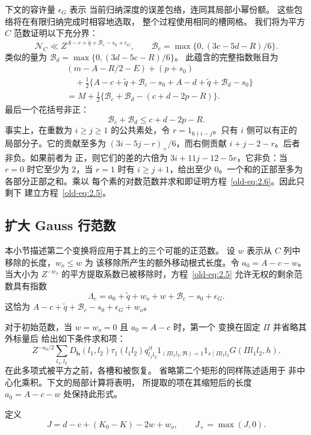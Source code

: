 下文的容许量 \(\epsilon_G\) 表示
当前归纳深度的误差包络，连同其局部小幂份额。
这些包络将在有限归纳完成时相容地选取，
整个过程使用相同的槽网格。
我们将为平方 \(C\)
范数证明以下充分界：
\begin{equation}
 \mathcal N_C\ll
 Z^{A-c+\widetilde q+\mathcal B_c-s_0+\epsilon_G},
 \qquad
 \mathcal B_c=\max\{0,(3c-5d-R)/6\}.
 \label{old-eq:2.5}
\end{equation}
类似的量为
\(\mathcal B_d=\max\{0,(3d-5c-R)/6\}\)。
此蕴含的完整指数账目为
\[
 \begin{aligned}
 &(m-A-R/2-E)+(p+s_0)\\
 &\quad+\tfrac12\{A-c+\widetilde q+\mathcal B_c-s_0
                  +A-d+\widetilde q+\mathcal B_d-s_0\}\\
 &=M+\tfrac12\{\mathcal B_c+\mathcal B_d-(c+d-2p-R)\}.
 \end{aligned}
\]
最后一个花括号非正：
\begin{equation}
 \mathcal B_c+\mathcal B_d\le c+d-2p-R.
 \label{old-eq:2.6}
\end{equation}
事实上，在重数为 \(i\ge j\ge1\) 的公共素处，令
\(r=1_{6\nmid i-j}\)。只有 \(i\) 侧可以有正的
局部分子。它的贡献至多为
\((3i-5j-r)_+/6\)，而右侧贡献
\(i+j-2-r\)。后者非负。如果前者为
正，则它们的差的六倍为
\(3i+11j-12-5r\)，它非负：当 \(r=0\) 时它至少为
\(2\)，当 \(r=1\) 时有 \(i\ge j+1\)，给出至少
\(0\)。一个和的正部至多为各部分正部之和。乘以
每个素的对数范数并求和即证明方程~\eqref{old-eq:2.6}。因此只剩下
建立方程~\eqref{old-eq:2.5}。

\subsection{扩大 Gauss 行范数}\label{sec:plain-gauss-enlargement}

本小节描述第二个变换将应用于其上的三个可能的正范数。
设 \(w\) 表示从 \(C\) 列中移除的长度，\(w_o\le w\) 为
该移除所产生的额外移动根式长度。令
\(a_0=A-c-w\)。当大小为
\(Z^{-w_o}\) 的平方提取系数已被移除时，方程~\eqref{old-eq:2.5}
允许无权的剩余范数具有指数
\begin{equation}
 \Lambda_c=
 a_0+\widetilde q+w_o+w+\mathcal B_c-s_0+\epsilon_G.
 \label{old-eq:2.7}
\end{equation}
这恰为 \(A-c+\widetilde q+\mathcal B_c-s_0+\epsilon_G+w_o\)。

对于初始范数，当 \(w=w_o=0\) 且 \(a_0=A-c\) 时，第一个
变换在固定 \(\Pi\) 并省略其外标量后
给出如下条件求和项：
\begin{equation}
 Z^{-a_0/2}\sum_{l_1,l_2}
 D_{\mathbf b}(l_1,l_2)\tau_1(l_1l_2)q_{l_1l_2}^{it}
 1_{(\Pi l_1l_2,\mathfrak R)=1}1_{s\mid\Pi l_1l_2}
 G(\Pi l_1l_2,h).
 \label{old-eq:2.18c}
\end{equation}
在此多项式被平方之前，各槽和被恢复。
省略第二个矩形的同样陈述适用于
非中心化乘积。下文的局部计算将表明，
所提取的项在其缩短后的长度 \(a_0=A-c-w\) 处保持此形式。

定义
\begin{equation}
 J=d-c+(K_0-K)-2w+w_o,\qquad J_+=\max(J,0).
 \label{old-eq:2.8}
\end{equation}
